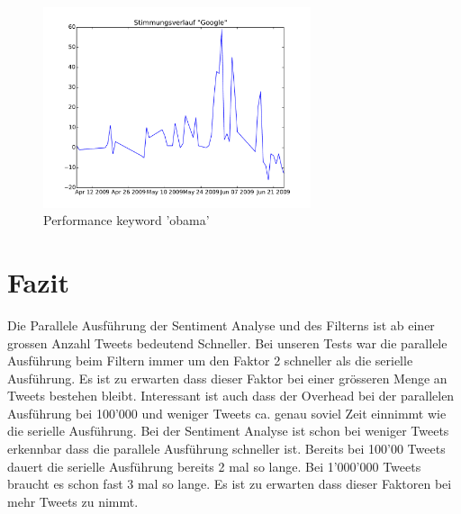 \documentclass[12pt, oneside]{report}   	%
\begin{document}
\begin{figure}[h]
\begin{center}
\includegraphics[width=0.7\textwidth]{bilder/moodPlotGoogle.pdf}
\caption{Performance keyword 'obama'}
\label{img:performancefilter3}
\end{center}
\end{figure}


\chapter{Fazit}
Die Parallele Ausführung der Sentiment Analyse und des Filterns ist ab einer grossen Anzahl Tweets bedeutend Schneller. Bei unseren Tests war die parallele Ausführung beim Filtern immer um den Faktor 2 schneller als die serielle Ausführung. Es ist zu erwarten dass dieser Faktor bei einer grösseren Menge an Tweets bestehen bleibt. Interessant ist auch dass der Overhead bei der parallelen Ausführung bei 100'000 und weniger Tweets ca. genau soviel Zeit einnimmt wie die serielle Ausführung. \newline{}
Bei der Sentiment Analyse ist schon bei weniger Tweets erkennbar dass die parallele Ausführung schneller ist. Bereits bei 100'00 Tweets dauert die serielle Ausführung bereits 2 mal so lange. Bei 1'000'000 Tweets braucht es schon fast 3 mal so lange. Es ist zu erwarten dass dieser Faktoren bei mehr Tweets zu nimmt.


\end{document}
